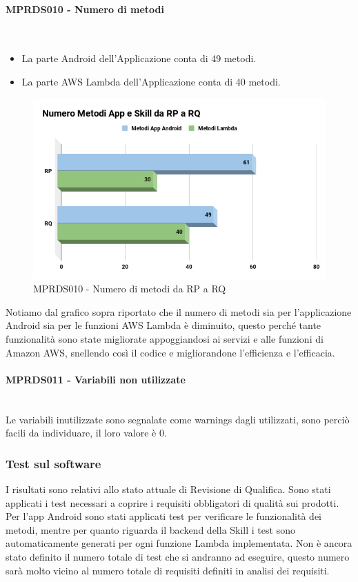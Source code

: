 \paragraph{MPRDS010 - Numero di metodi}\mbox{}\\[0.4cm]
\begin{itemize}
	\item La parte Android dell'Applicazione conta di 49 metodi.
	\item La parte AWS Lambda dell'Applicazione conta di 40 metodi.
\end{itemize}
\begin{figure}[H]
	\centering
	\includegraphics[width=13cm,keepaspectratio]{../includes/pics/nMetodi.png}
	\caption{\label{fig:mission}MPRDS010 -  Numero di metodi da RP a RQ}
\end{figure}
Notiamo dal grafico sopra riportato che il numero di metodi sia per l'applicazione Android sia per le funzioni AWS Lambda è diminuito, questo perché tante funzionalità sono state migliorate appoggiandosi ai servizi e alle funzioni di Amazon AWS, snellendo così il codice e migliorandone l'efficienza e l'efficacia.
\paragraph{MPRDS011 - Variabili non utilizzate}\mbox{}\\[0.4cm]
Le variabili inutilizzate sono segnalate come warnings dagli  utilizzati, sono perciò facili da individuare, il loro valore è 0.
\subsubsection{Test sul software}
I risultati sono relativi allo stato attuale di Revisione di Qualifica. Sono stati applicati i test necessari a coprire i requisiti obbligatori di qualità sui prodotti. Per l'app Android sono stati applicati test per verificare le funzionalità dei metodi, mentre per quanto riguarda il backend della Skill i test sono automaticamente generati per ogni funzione Lambda implementata. Non è ancora stato definito il numero totale di test che si andranno ad eseguire, questo numero sarà molto vicino al numero totale di requisiti definiti in analisi dei requisiti.
